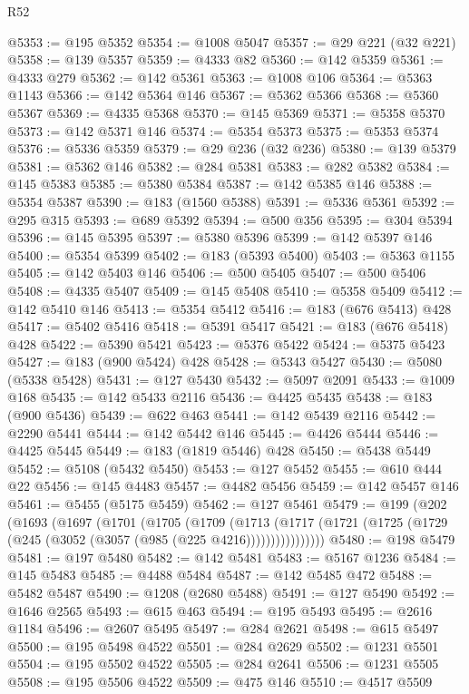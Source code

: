 \begin{lexlean}{R52}
\begin{coremodule}
{{{{{{{{{{{{{{{{{{{{{{{{{{{{{{{{{{{{{{{{{{{{{{{{{{{{{{{{{{{{{{{{{{{{{{{{{{{{{{{{{{{{{{{{{{{{{{{{{{{{{{{{{{{{{{{{{{{{{{{{{{{{{{{{{{{{{{{{{{{{{{{{{{{{{{{{{{{{{{{{{{{{{{{{{{{{{{{{{{{{{{{{{{{{{{{{{{{{{{@5353 := @195 @5352
@5354 := @1008 @5047
@5357 := @29 @221 (@32 @221)
@5358 := @139 @5357
@5359 := @4333 @82
@5360 := @142 @5359
@5361 := @4333 @279
@5362 := @142 @5361
@5363 := @1008 @106
@5364 := @5363 @1143
@5366 := @142 @5364 @146
@5367 := @5362 @5366
@5368 := @5360 @5367
@5369 := @4335 @5368
@5370 := @145 @5369
@5371 := @5358 @5370
@5373 := @142 @5371 @146
@5374 := @5354 @5373
@5375 := @5353 @5374
@5376 := @5336 @5359
@5379 := @29 @236 (@32 @236)
@5380 := @139 @5379
@5381 := @5362 @146
@5382 := @284 @5381
@5383 := @282 @5382
@5384 := @145 @5383
@5385 := @5380 @5384
@5387 := @142 @5385 @146
@5388 := @5354 @5387
@5390 := @183 (@1560 @5388)
@5391 := @5336 @5361
@5392 := @295 @315
@5393 := @689 @5392
@5394 := @500 @356
@5395 := @304 @5394
@5396 := @145 @5395
@5397 := @5380 @5396
@5399 := @142 @5397 @146
@5400 := @5354 @5399
@5402 := @183 (@5393 @5400)
@5403 := @5363 @1155
@5405 := @142 @5403 @146
@5406 := @500 @5405
@5407 := @500 @5406
@5408 := @4335 @5407
@5409 := @145 @5408
@5410 := @5358 @5409
@5412 := @142 @5410 @146
@5413 := @5354 @5412
@5416 := @183 (@676 @5413) @428
@5417 := @5402 @5416
@5418 := @5391 @5417
@5421 := @183 (@676 @5418) @428
@5422 := @5390 @5421
@5423 := @5376 @5422
@5424 := @5375 @5423
@5427 := @183 (@900 @5424) @428
@5428 := @5343 @5427
@5430 := @5080 (@5338 @5428)
@5431 := @127 @5430
@5432 := @5097 @2091
@5433 := @1009 @168
@5435 := @142 @5433 @2116
@5436 := @4425 @5435
@5438 := @183 (@900 @5436)
@5439 := @622 @463
@5441 := @142 @5439 @2116
@5442 := @2290 @5441
@5444 := @142 @5442 @146
@5445 := @4426 @5444
@5446 := @4425 @5445
@5449 := @183 (@1819 @5446) @428
@5450 := @5438 @5449
@5452 := @5108 (@5432 @5450)
@5453 := @127 @5452
@5455 := @610 @444 @22
@5456 := @145 @4483
@5457 := @4482 @5456
@5459 := @142 @5457 @146
@5461 := @5455 (@5175 @5459)
@5462 := @127 @5461
@5479 := @199
    (@202
      (@1693
        (@1697
          (@1701
            (@1705
              (@1709
                (@1713
                  (@1717 (@1721 (@1725 (@1729 (@245 (@3052 (@3057 (@985 (@225 @4216))))))))))))))))
@5480 := @198 @5479
@5481 := @197 @5480
@5482 := @142 @5481
@5483 := @5167 @1236
@5484 := @145 @5483
@5485 := @4488 @5484
@5487 := @142 @5485 @472
@5488 := @5482 @5487
@5490 := @1208 (@2680 @5488)
@5491 := @127 @5490
@5492 := @1646 @2565
@5493 := @615 @463
@5494 := @195 @5493
@5495 := @2616 @1184
@5496 := @2607 @5495
@5497 := @284 @2621
@5498 := @615 @5497
@5500 := @195 @5498 @4522
@5501 := @284 @2629
@5502 := @1231 @5501
@5504 := @195 @5502 @4522
@5505 := @284 @2641
@5506 := @1231 @5505
@5508 := @195 @5506 @4522
@5509 := @475 @146
@5510 := @4517 @5509
}}}}}}}}}}}}}}}}}}}}}}}}}}}}}}}}}}}}}}}}}}}}}}}}}}}}}}}}}}}}}}}}}}}}}}}}}}}}}}}}}}}}}}}}}}}}}}}}}}}}}}}}}}}}}}}}}}}}}}}}}}}}}}}}}}}}}}}}}}}}}}}}}}}}}}}}}}}}}}}}}}}}}}}}}}}}}}}}}}}}}}}}}}}}}}}}}}}}}}
\end{coremodule}
\end{lexlean}
